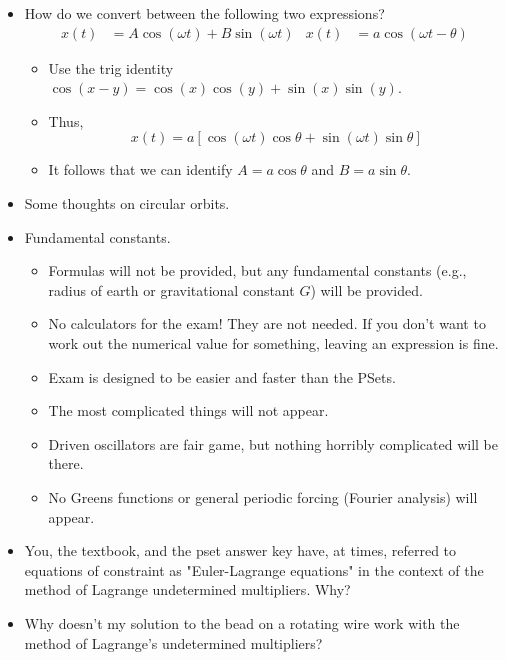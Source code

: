 \documentclass[../notes.tex]{subfiles}
\begin{document}
\begin{itemize}
\begin{itemize}
    \end{itemize}
    \item How do we convert between the following two expressions?
    \begin{align*}
        x(t) &= A\cos(\omega t)+B\sin(\omega t)&
        x(t) &= a\cos(\omega t-\theta)
    \end{align*}
    \begin{itemize}
        \item Use the trig identity $\cos(x-y)=\cos(x)\cos(y)+\sin(x)\sin(y)$.
        \item Thus,
        \begin{equation*}
            x(t) = a[\cos(\omega t)\cos\theta+\sin(\omega t)\sin\theta]
        \end{equation*}
        \item It follows that we can identify $A=a\cos\theta$ and $B=a\sin\theta$.
    \end{itemize}
    \item Some thoughts on circular orbits.
    \item Fundamental constants.
    \begin{itemize}
        \item Formulas will not be provided, but any fundamental constants (e.g., radius of earth or gravitational constant $G$) will be provided.
        \item No calculators for the exam! They are not needed. If you don't want to work out the numerical value for something, leaving an expression is fine.
        \item Exam is designed to be easier and faster than the PSets.
        \item The most complicated things will not appear.
        \item Driven oscillators are fair game, but nothing horribly complicated will be there.
        \item No Greens functions or general periodic forcing (Fourier analysis) will appear.
    \end{itemize}
    \item You, the textbook, and the pset answer key have, at times, referred to equations of constraint as "Euler-Lagrange equations" in the context of the method of Lagrange undetermined multipliers. Why?
    \item Why doesn't my solution to the bead on a rotating wire work with the method of Lagrange's undetermined multipliers?
    \begin{itemize}

\end{itemize}
\end{itemize}
\end{document}
